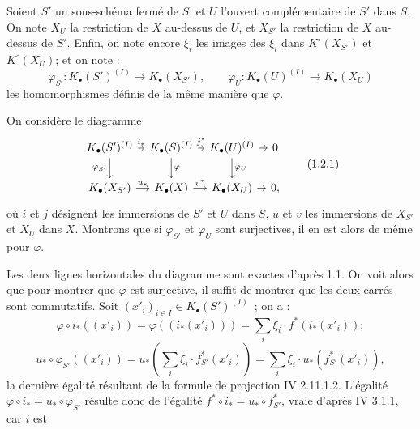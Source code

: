 Soient $S'$ un sous-schéma fermé de $S$, et $U$ l'ouvert complémentaire de $S'$ dans $S$. On note $X_U$ la restriction de $X$ au-dessus de $U$, et $X_{S'}$ la restriction de $X$ au-dessus de $S'$. Enfin, on note encore $\xi_i$ les images des $\xi_i$ dans $K^\circ(X_{S'})$ et $K^\circ(X_U)$; et on note :
\[
\varphi_{S'}:K_\bullet(S')^{(I)}\to K_\bullet(X_{S'}),\qquad
\varphi_U:K_\bullet(U)^{(I)}\to K_\bullet(X_U)
\]
les homomorphismes définis de la même manière que $\varphi$.

On considère le diagramme
\[
\begin{tikzcd}[column sep=tiny]
K_\bullet(S')^{(I)} \arrow[r,"i_*"] \arrow[d,"\varphi_{S'}"'] & K_\bullet(S)^{(I)} \arrow[r,"j^*"] \arrow[d,"\varphi"] & K_\bullet(U)^{(I)} \arrow[r] \arrow[d,"\varphi_U"] & 0\\
K_\bullet(X_{S'}) \arrow[r,"u_*"] & K_\bullet(X) \arrow[r,"v^*"] & K_\bullet(X_U) \arrow[r] & 0,
\end{tikzcd}\tag{1.2.1}
\]
où $i$ et $j$ désignent les immersions de $S'$ et $U$ dans $S$, $u$ et $v$ les immersions de $X_{S'}$ et $X_U$ dans $X$. Montrons que si $\varphi_{S'}$ et $\varphi_U$ sont surjectives, il en est alors de même pour $\varphi$.

Les deux lignes horizontales du diagramme sont exactes d'après 1.1. On voit alors que pour montrer que $\varphi$ est surjective, il suffit de montrer que les deux carrés sont commutatifs. Soit $(x'_i)_{i\in I}\in K_\bullet(S')^{(I)}$~; on a :
\[
\varphi\circ i_*((x'_i))=\varphi((i_*(x'_i)))=\sum_i \xi_i\cdot f^*(i_*(x'_i));
\]
\[
u_*\circ\varphi_{S'}((x'_i))=u_*\left(\sum_i \xi_i\cdot f^*_{S'}(x'_i)\right)=\sum_i \xi_i\cdot u_*(f^*_{S'}(x'_i)),
\]
la dernière égalité résultant de la formule de projection IV 2.11.1.2. L'égalité $\varphi\circ i_*=u_*\circ\varphi_{S'}$ résulte donc de l'égalité $f^*\circ i_*=u_*\circ f^*_{S'}$, vraie d'après IV 3.1.1, car $i$ est
